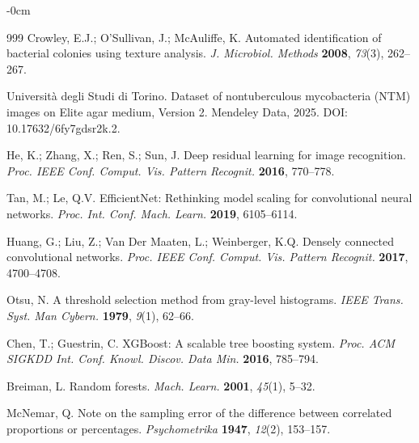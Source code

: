 \documentclass[journal,article,submit,pdftex,moreauthors]{Definitions/mdpi}
\begin{document}
\begin{adjustwidth}{-\extralength}{0cm}
\begin{thebibliography}{999}
Crowley, E.J.; O'Sullivan, J.; McAuliffe, K. Automated identification of bacterial colonies using texture analysis. {\em J. Microbiol. Methods} {\bf 2008}, {\em 73}(3), 262–267.

Università degli Studi di Torino. Dataset of nontuberculous mycobacteria (NTM) images on Elite agar medium, Version 2. Mendeley Data, 2025. DOI: 10.17632/6fy7gdsr2k.2.

He, K.; Zhang, X.; Ren, S.; Sun, J. Deep residual learning for image recognition. {\em Proc. IEEE Conf. Comput. Vis. Pattern Recognit.} {\bf 2016}, 770–778.

Tan, M.; Le, Q.V. EfficientNet: Rethinking model scaling for convolutional neural networks. {\em Proc. Int. Conf. Mach. Learn.} {\bf 2019}, 6105–6114.

Huang, G.; Liu, Z.; Van Der Maaten, L.; Weinberger, K.Q. Densely connected convolutional networks. {\em Proc. IEEE Conf. Comput. Vis. Pattern Recognit.} {\bf 2017}, 4700–4708.

Otsu, N. A threshold selection method from gray-level histograms. {\em IEEE Trans. Syst. Man Cybern.} {\bf 1979}, {\em 9}(1), 62–66.

Chen, T.; Guestrin, C. XGBoost: A scalable tree boosting system. {\em Proc. ACM SIGKDD Int. Conf. Knowl. Discov. Data Min.} {\bf 2016}, 785–794.

Breiman, L. Random forests. {\em Mach. Learn.} {\bf 2001}, {\em 45}(1), 5–32.

McNemar, Q. Note on the sampling error of the difference between correlated proportions or percentages. {\em Psychometrika} {\bf 1947}, {\em 12}(2), 153–157.
\end{thebibliography}

%


\end{adjustwidth}
\end{document}
